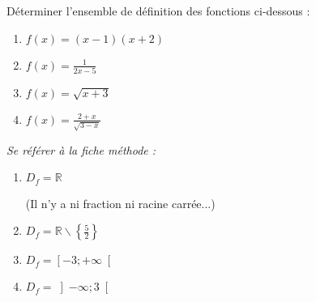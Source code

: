 
%
Déterminer l'ensemble de définition des fonctions ci-dessous :
\begin{enumerate}
\item
$f\left(x\right)=\left(x-1\right)\left(x+2\right)$
\item
$f\left(x\right)=\frac{1}{2x-5}$
\item
$f\left(x\right)=\sqrt{x+3}$
\item
$f\left(x\right)=\frac{2+x}{\sqrt{3-x}}$
\end{enumerate}
\begin{corrige}
     \textit{Se référer à la fiche méthode :  }
\begin{enumerate}
     \item
     $D_{f} = \mathbb{R}$
     \par
     (Il n'y a ni fraction ni racine carrée...)
     \item
     $D_{f}=\mathbb{R}\backslash\left\{\frac{5}{2}\right\}$
     \item
     $D_{f}=\left[-3 ; +\infty \right[$
     \item
     $D_{f}=\left]-\infty  ; 3\right[$
\end{enumerate}
\end{corrige}
